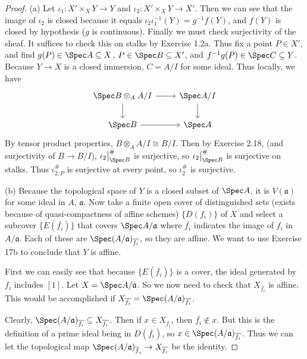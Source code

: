 \begin{proof}
	(a) Let $\iota_{1}: X'\times_X Y \to Y $ and $\iota _2: X'\times _X Y \to X'$.
	Then we can see that the image of $\iota _2 $ is closed because it equals $\iota_2 \iota_1^{-1}(Y) = g^{-1}f(Y)$, and $f(Y) $ is closed by hypothesis ($g $ is continuous).
	Finally we must check surjectivity of the sheaf.
	It suffices to check this on stalks by Exercise 1.2a.
	Thus fix a point $P \in X' $, and find $g(P) \in \Spec A \subseteq X $, $P \in \Spec B \subseteq X'$, and $f^{-1}g(P) \in \Spec C \subseteq Y $.
	Because $Y\to X $ is a closed immersion, $C = A / I $ for some ideal.
	Thus locally, we have
	\[
	\begin{tikzcd}
	\Spec B \otimes_A A / I & \Spec A / I\\
	\Spec B & \Spec A
	\arrow[from=1-1,to=1-2]
	\arrow[from=1-1,to=2-1]
	\arrow[from=2-1,to=2-2]
	\arrow[from=1-2,to=2-2]
	\end{tikzcd}
	\]
	By tensor product properties, $B \otimes _A A / I \cong B / I $.
	Then by Exercise 2.18, (and surjectivity of $B \to B / I $), $\iota_2\big|_{\Spec B}^\#$ is surjective, so $\iota_2\big|_{\Spec B}^\# $ is surjective on stalks.
	Thus $\iota_{2,P}^\#$ is surjective at every point, so $\iota_2^\# $ is surjective.

	(b) Because the topological space of $Y $ is a closed subset of $\Spec A $, it is $V(\mathfrak{a}) $ for some ideal in $A $, $\mathfrak{a} $.
	Now take a finite open cover of distinguished sets (exists because of quasi-compactness of affine schemes) $\{D(f_i)\}$ of $X $ and select a subcover $\{E(\overline{f_i})\}  $ that covers $\Spec A / \mathfrak{a} $ where $\overline{f_i}  $ indicates the image of $f_i $ in $A / \mathfrak{a} $.
	Each of these are $\Spec (A / \mathfrak{a})_{\overline{f_i}} $, so they are affine.
	We want to use Exercise 17b to conclude that $Y $ is affine.

	First we can easily see that because $\{E(\overline{f_i})\}   $ is a cover, the ideal generated by $f_i $ includes $[1] $.
	Let $X = \Spec A / \mathfrak{a} $.
	So we now need to check that $X_{\overline{f_i}} $ is affine.
	This would be accomplished if $X_{\overline{f_i} } = \Spec (A / \mathfrak{a})_{\overline{f_i} } $.

	Clearly, $\Spec (A / \mathfrak{a})_{\overline{f_i} } \subseteq X_{\overline{f_i} } $.
	Then if $x \in X_{\overline{f_i} }$, then $\overline{f_i} \notin x  $.
	But this is the definition of a prime ideal being in $D(\overline{f_i})  $, so $x\in \Spec (A / \mathfrak{a})_{\overline{f_i} } $.
	Thus we can let the topological map $\Spec (A / \mathfrak{a})_{\overline{f}_i } \to X_{\overline{f_i} }$ be the identity.


\end{proof}
